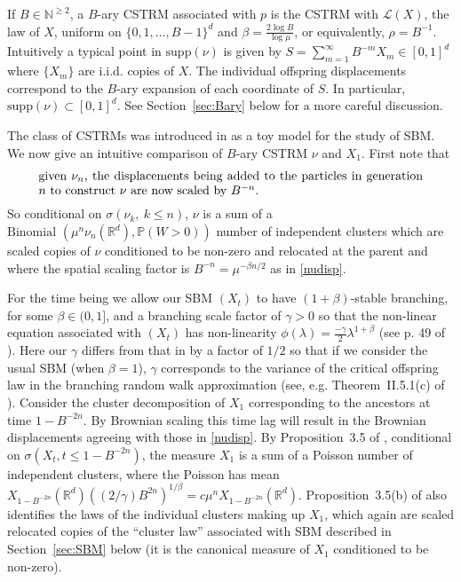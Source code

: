 \documentclass[12pt]{article}
\numberwithin{theorem}{section}
\theoremstyle{def}
\numberwithin{equation}{section}
\renewcommand{\P}{\mathbb{P}}
\newcommand{\R}{\mathbb{R}}
\newcommand{\N}{\mathbb{N}}
\newcommand{\cL}{\mathcal{L}}
\newcommand{\supp}{\mathrm{supp}}
\begin{document}
If $B\in\N^{\ge 2}$, a $B$-ary CSTRM
associated with $p$ is the CSTRM with $\cL(X)$, the law of $X$, uniform on $\{0,1,\dots,B-1\}^d$ and $\beta=\frac{2\log B}{\log \mu}$, or equivalently, $\rho=B^{-1}$. 
Intuitively a typical point in $\supp(\nu)$ is given by $S=\sum_{m=1}^\infty B^{-m}X_m\in[0,1]^d$ where $\{X_m\}$ are i.i.d. copies of $X$. 
The individual offspring displacements correspond to the $B$-ary expansion of each coordinate of $S$. In particular, $\supp(\nu)\subset [0,1]^d$.  
See Section~\ref{sec:Bary} below for a more careful discussion. 

The class of CSTRMs was introduced in \cite{ADHP} as a toy model for the study of SBM. 
We now give an intuitive comparison of $B$-ary CSTRM $\nu$ and $X_1$. First note that 
\begin{equation}\label{nudisp}
\parbox[t]{0.9\textwidth}{given $\nu_n$, the displacements being added to the particles in generation $n$ to construct $\nu$ are now scaled by $B^{-n}$.}
\end{equation}
So conditional on $\sigma(\nu_k,\ k \le n)$, $\nu$ is a sum of a $\text{Binomial }(\mu^n\nu_n(\R^d),\P(W>0))$ number of independent clusters which are scaled copies of $\nu$ conditioned to be non-zero and relocated at the parent and where the spatial scaling factor is $B^{-n}=\mu^{-\beta n/2}$ as in \eqref{nudisp}. 

For the time being we allow our SBM $(X_t)$ to have $(1+\beta)$-stable branching, for some $\beta\in (0,1]$, and a branching scale factor of $\gamma>0$ so that the non-linear equation associated with $(X_t)$ has non-linearity $\phi(\lambda)=\frac{-\gamma}{2}\lambda^{1+\beta}$ (see p. 49 of \cite{DP91}). 
Here our $\gamma$ differs from that in \cite{DP91} by a factor of $1/2$ so that if we consider the usual SBM (when $\beta=1$), 
$\gamma$ corresponds to the variance of the
critical offspring law in the branching random walk approximation (see, e.g. Theorem~II.5.1(c) of \cite{Per02}). 
Consider the cluster decomposition of $X_1$ corresponding to the ancestors at time $1-B^{-2n}$. 
By Brownian scaling  this time lag will result in the Brownian displacements agreeing with those in \eqref{nudisp}. 
By Proposition~3.5 of  \cite{DP91}, conditional on $\sigma(X_t,t\le 1-B^{-2n})$, the measure $X_1$ is a sum of a Poisson number of independent clusters, where the Poisson  has mean $X_{1-B^{-2n}}(\R^d)((2/\gamma)B^{2n})^{1/\beta}=c\mu^n X_{1-B^{-2n}}(\R^d)$.
Proposition~3.5(b) of \cite{DP91} also identifies the laws of the individual clusters making up $X_1$, which again are scaled relocated copies of the ``cluster law'' associated with SBM described in Section~\ref{sec:SBM} below (it is the canonical measure of $X_1$ conditioned to be non-zero).    
\end{document}
